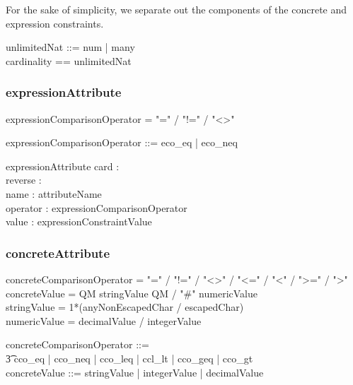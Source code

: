 \documentclass{article}
\def\bnf#1{{\scriptsize {{#1}} }}
\begin{document}
For the sake of simplicity, we separate out the components of the concrete and expression constraints.

\begin{zed}
unlimitedNat ::= num \ldata \nat \rdata | many \\
cardinality == \nat \cross unlimitedNat \\
[reverseFlag] 
\end{zed}

\subsubsection{expressionAttribute}
\begin{framed}
\noindent
\bnf{expressionComparisonOperator = "=" / "!=" / "\textless\textgreater"}
\end{framed}
\begin{zed}
expressionComparisonOperator ::= eco\_eq | eco\_neq
\end{zed}


\begin{schema}{expressionAttribute}
	card : \optional[cardinality] \\
	reverse : \optional[reverseFlag] \\
	name : attributeName \\
	operator : expressionComparisonOperator \\
	value : expressionConstraintValue
\end{schema}


\subsubsection{concreteAttribute}
\begin{framed}
\noindent
\bnf{concreteComparisonOperator = "=" / "!=" /  "\textless\textgreater" / "\textless=" / "\textless" / "\textgreater=" / "\textgreater"} \\
\bnf{concreteValue =  QM stringValue QM / "\#" numericValue} \\
\bnf{stringValue = 1*(anyNonEscapedChar / escapedChar)} \\
\bnf{numericValue = decimalValue / integerValue}
\end{framed}
\begin{zed}
concreteComparisonOperator ::= \\
\t3 cco\_eq | cco\_neq | cco\_leq | ccl\_lt | cco\_geq | cco\_gt \\
concreteValue ::= stringValue | integerValue | decimalValue
\end{zed}
\end{document}
